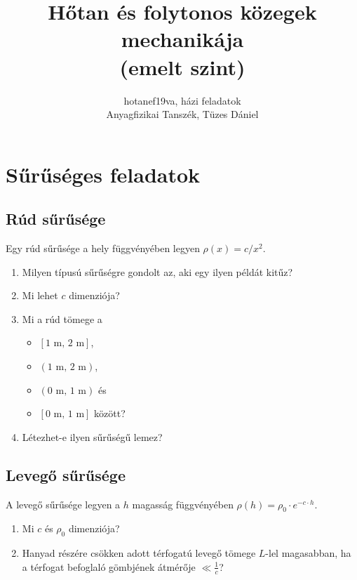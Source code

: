 \documentclass[12pt,a4paper]{scrartcl}
\begin{document}
\title{Hőtan és folytonos közegek mechanikája\\(emelt szint)}
\author{hotanef19va, házi feladatok\\Anyagfizikai Tanszék, Tüzes Dániel}
\maketitle
\tableofcontents

\iffalse %
\section{Sűrűséges feladatok}
\subsection{Rúd sűrűsége}
Egy rúd sűrűsége a hely függvényében legyen $\rho \left( x \right) = c/{x^2}$.
\begin{enumerate}
\item Milyen típusú sűrűségre gondolt az, aki egy ilyen példát kitűz?
\item Mi lehet $c$ dimenziója?
\item Mi a rúd tömege a
\begin{itemize}
\item $\left[ 1{\text{ m, }}2{\text{ m}} \right]$,
\item $\left( 1{\text{ m, }}2{\text{ m}} \right)$,
\item ${\left( {0{\text{ m, }}1{\text{ m}}} \right)}$ és
\item ${\left[ {0{\text{ m, }}1{\text{ m}}} \right]}$ között?
\end{itemize}
\item Létezhet-e ilyen sűrűségű lemez?
\end{enumerate}
\subsection{Levegő sűrűsége}
A levegő sűrűsége legyen a $h$ magasság függvényében $\rho \left( h \right) = {\rho _0} \cdot {e^{ - c \cdot h}}$.
\begin{enumerate}
\item Mi $c$ és $\rho_0$ dimenziója?
\item Hanyad részére csökken adott térfogatú levegő tömege $L$-lel magasabban, ha a térfogat befoglaló gömbjének átmérője $ \ll \frac{1}{c}$?
\end{enumerate}
\end{document}
